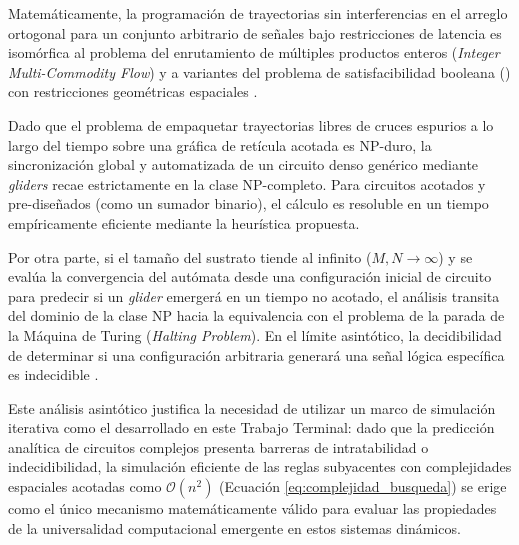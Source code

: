 Matemáticamente, la programación de trayectorias sin interferencias en el arreglo ortogonal para un conjunto arbitrario de señales bajo restricciones de latencia es isomórfica al problema del enrutamiento de múltiples productos enteros (\textit{Integer Multi-Commodity Flow}) y a variantes del problema de satisfacibilidad booleana () con restricciones geométricas espaciales \cite{Kari2005}. 

Dado que el problema de empaquetar trayectorias libres de cruces espurios a lo largo del tiempo sobre una gráfica de retícula acotada es NP-duro, la sincronización global y automatizada de un circuito denso genérico mediante \textit{gliders} recae estrictamente en la clase $\text{NP}$-completo. Para circuitos acotados y pre-diseñados (como un sumador binario), el cálculo es resoluble en un tiempo empíricamente eficiente mediante la heurística propuesta.

Por otra parte, si el tamaño del sustrato tiende al infinito ($M, N \to \infty$) y se evalúa la convergencia del autómata desde una configuración inicial de circuito para predecir si un \textit{glider} emergerá en un tiempo no acotado, el análisis transita del dominio de la clase NP hacia la equivalencia con el problema de la parada de la Máquina de Turing (\textit{Halting Problem}). En el límite asintótico, la decidibilidad de determinar si una configuración arbitraria generará una señal lógica específica es indecidible \cite{Kari2005}.

Este análisis asintótico justifica la necesidad de utilizar un marco de simulación iterativa como el desarrollado en este Trabajo Terminal: dado que la predicción analítica de circuitos complejos presenta barreras de intratabilidad o indecidibilidad, la simulación eficiente de las reglas subyacentes con complejidades espaciales acotadas como $\mathcal{O}(n^2)$ (Ecuación \eqref{eq:complejidad_busqueda}) se erige como el único mecanismo matemáticamente válido para evaluar las propiedades de la universalidad computacional emergente en estos sistemas dinámicos.